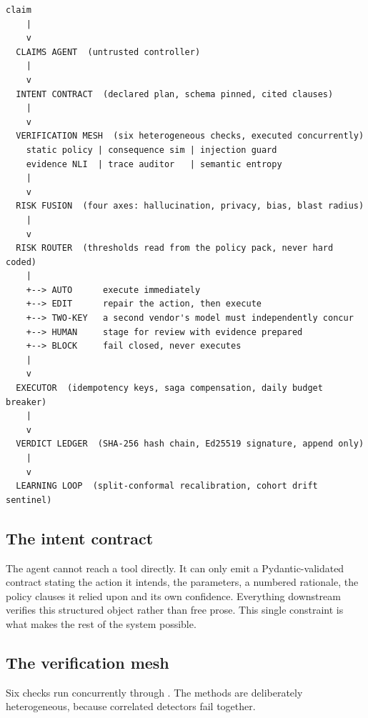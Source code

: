 \documentclass[10pt]{article}
\begin{document}
\vspace{-2pt}
\begin{Verbatim}[fontsize=\scriptsize, xleftmargin=6pt, commandchars=\\\{\}]
  claim
    |
    v
  CLAIMS AGENT  (untrusted controller)
    |
    v
  INTENT CONTRACT  (declared plan, schema pinned, cited clauses)
    |
    v
  VERIFICATION MESH  (six heterogeneous checks, executed concurrently)
    static policy | consequence sim | injection guard
    evidence NLI  | trace auditor   | semantic entropy
    |
    v
  RISK FUSION  (four axes: hallucination, privacy, bias, blast radius)
    |
    v
  RISK ROUTER  (thresholds read from the policy pack, never hard coded)
    |
    +--> AUTO      execute immediately
    +--> EDIT      repair the action, then execute
    +--> TWO-KEY   a second vendor's model must independently concur
    +--> HUMAN     stage for review with evidence prepared
    +--> BLOCK     fail closed, never executes
    |
    v
  EXECUTOR  (idempotency keys, saga compensation, daily budget breaker)
    |
    v
  VERDICT LEDGER  (SHA-256 hash chain, Ed25519 signature, append only)
    |
    v
  LEARNING LOOP  (split-conformal recalibration, cohort drift sentinel)
\end{Verbatim}

\subsection{The intent contract}

The agent cannot reach a tool directly. It can only emit a Pydantic-validated contract
stating the action it intends, the parameters, a numbered rationale, the policy clauses
it relied upon and its own confidence. Everything downstream verifies this structured
object rather than free prose. This single constraint is what makes the rest of the
system possible.

\subsection{The verification mesh}

Six checks run concurrently through . The methods are deliberately
heterogeneous, because correlated detectors fail together.
\end{document}
